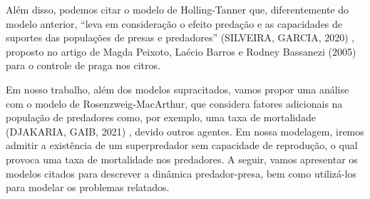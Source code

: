 Além disso, podemos citar o modelo de Holling-Tanner que, diferentemente do modelo anterior, ``leva em consideração o efeito predação e as capacidades de suportes das populações de presas e predadores'' (SILVEIRA, GARCIA, 2020) \cite{gs_rg_2020}, proposto no artigo de Magda Peixoto, Laécio Barros e Rodney Bassanezi (2005)  \cite{mp_lb_rb_2005} para o controle de praga nos citros. 

Em nosso trabalho, além dos modelos supracitados, vamos propor uma análise com o modelo de Rosenzweig-MacArthur, que considera fatores adicionais na população de predadores como, por exemplo, uma taxa de mortalidade (DJAKARIA, GAIB, 2021) \cite{id_mg_r_2021}, devido outros agentes. Em nossa modelagem, iremos admitir a existência de um superpredador sem capacidade de reprodução, o qual provoca uma taxa de mortalidade nos predadores. A seguir, vamos apresentar os modelos citados para descrever a dinâmica predador-presa, bem como utilizá-los para modelar os problemas relatados.